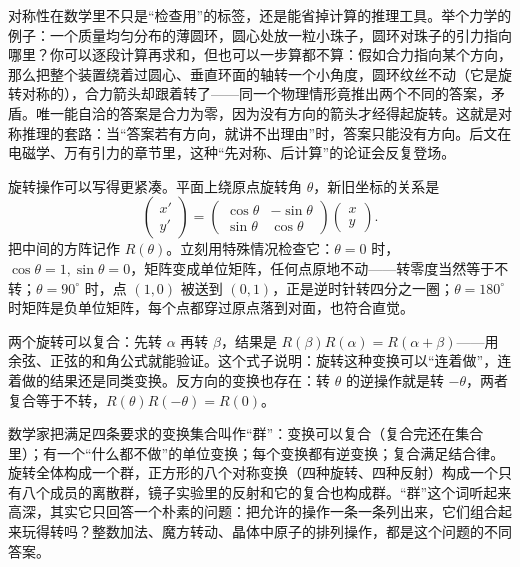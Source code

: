 对称性在数学里不只是“检查用”的标签，还是能省掉计算的推理工具。举个力学的例子：一个质量均匀分布的薄圆环，圆心处放一粒小珠子，圆环对珠子的引力指向哪里？你可以逐段计算再求和，但也可以一步算都不算：假如合力指向某个方向，那么把整个装置绕着过圆心、垂直环面的轴转一个小角度，圆环纹丝不动（它是旋转对称的），合力箭头却跟着转了——同一个物理情形竟推出两个不同的答案，矛盾。唯一能自洽的答案是合力为零，因为没有方向的箭头才经得起旋转。这就是对称推理的套路：当“答案若有方向，就讲不出理由”时，答案只能没有方向。后文在电磁学、万有引力的章节里，这种“先对称、后计算”的论证会反复登场。

\begin{mathbridge}
旋转操作可以写得更紧凑。平面上绕原点旋转角 \(\theta\)，新旧坐标的关系是
\[
\begin{pmatrix} x' \\ y' \end{pmatrix}
=
\begin{pmatrix} \cos\theta & -\sin\theta \\ \sin\theta & \cos\theta \end{pmatrix}
\begin{pmatrix} x \\ y \end{pmatrix}.
\]
把中间的方阵记作 \(R(\theta)\)。立刻用特殊情况检查它：\(\theta=0\) 时，\(\cos\theta=1,\sin\theta=0\)，矩阵变成单位矩阵，任何点原地不动——转零度当然等于不转；\(\theta=90^\circ\) 时，点 \((1,0)\) 被送到 \((0,1)\)，正是逆时针转四分之一圈；\(\theta=180^\circ\) 时矩阵是负单位矩阵，每个点都穿过原点落到对面，也符合直觉。

两个旋转可以复合：先转 \(\alpha\) 再转 \(\beta\)，结果是 \(R(\beta)R(\alpha)=R(\alpha+\beta)\)——用余弦、正弦的和角公式就能验证。这个式子说明：旋转这种变换可以“连着做”，连着做的结果还是同类变换。反方向的变换也存在：转 \(\theta\) 的逆操作就是转 \(-\theta\)，两者复合等于不转，\(R(\theta)R(-\theta)=R(0)\)。

数学家把满足四条要求的变换集合叫作“群”：变换可以复合（复合完还在集合里）；有一个“什么都不做”的单位变换；每个变换都有逆变换；复合满足结合律。旋转全体构成一个群，正方形的八个对称变换（四种旋转、四种反射）构成一个只有八个成员的离散群，镜子实验里的反射和它的复合也构成群。“群”这个词听起来高深，其实它只回答一个朴素的问题：把允许的操作一条一条列出来，它们组合起来玩得转吗？整数加法、魔方转动、晶体中原子的排列操作，都是这个问题的不同答案。
\end{mathbridge}

